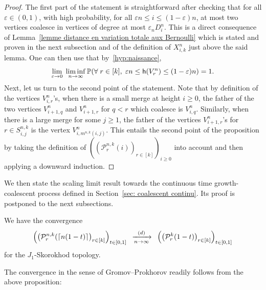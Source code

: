 \documentclass[AHL,Unicode,published]{cedram}
\newcommand{\e}{\varepsilon}
\newcommand{\cvloi}[1][n]{\enskip\xrightarrow[#1 \to \infty]{(d)}\enskip}
\renewcommand{\P}{{\mathbb{P}}}
\newcommand{\1}{\mathbbm{1}}
\newcommand{\Part}{\mathcal{P}}
\newcommand{\h}{\mathsf{h}}
\let\originalleft\left
\let\originalright\right
\renewcommand{\left}{\mathopen{}\mathclose\bgroup\originalleft}
\renewcommand{\right}{\aftergroup\egroup\originalright}
\renewcommand*{\to}{\mathchoice{\longrightarrow}{\rightarrow}{\rightarrow}{\rightarrow}}
\let\oldforall\forall
\renewcommand*{\forall}{\mathrel{\oldforall}}
\begin{document}
\begin{proof}
The first part of the statement is straightforward after checking that for all $\e\in (0,1)$, with high probability, for all $\e n \le i \le (1-\e) n$, at most two vertices coalesce in vertices of degree at most $\e_n D^n_i$. This is a direct consequence of Lemma~\ref{lemme distance en variation totale aux Bernoulli} which is stated and proven in the next subsection and of the definition of $X^n_{i,k}$ just above the said lemma. One can then use that by~\ref{hyp:naissance},
\[
\lim_{\e \to 0}\; \liminf_{n\to \infty} \P\left(\forall r \in [k], \; \e n \le \h(V^n_r) \le (1-\e) n \right) =1.
\]
Next, let us turn to the second point of the statement. Note that by definition of the vertices $V^n_{i,r}$'s, when there is a small merge at height $i\ge 0$, the father of the two vertices $V^n_{i+1,q}$ and $V^n_{i+1,r}$ for $q<r$ which coalesce is $V^n_{i,q}$. Similarly, when there is a large merge for some $j\ge 1$, the father of the vertices $V^n_{i+1, r}$'s for $r \in S^{n,k}_{i,j}$ is the vertex $V^n_{i, m^{n,k}(i,j)}$. This entails the second point of the proposition by taking the definition of $((\Part^{n,k}_r(i))_{r \in [k]})_{i\ge 0}$ into account and then applying a downward induction. 
\end{proof}

We then state the scaling limit result towards the continuous time growth-coalescent process defined in Section~\ref{sec: coalescent continu}. Its proof is postponed to the next subsections.

\begin{prop}\label{prop: cv coalescent Skorokhod}
We have the convergence
\[
\left(\left(\Part^{n,k}_r(\lceil n(1-t) \rceil\right)_{r \in [k]}\right)_{t\in [0,1]}
\cvloi[n]
\left(\left(\Part^k_r(1-t)\right)_{r \in [k]}\right)_{t \in [0,1]}
\]
for the $J_1$-Skorokhod topology.
\end{prop}

The convergence in the sense of Gromov--Prokhorov readily follows from the above proposition:
\end{document}
